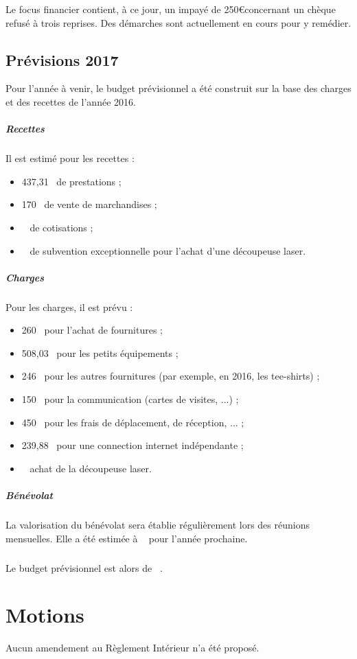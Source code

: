 \documentclass[11pt]{article}
\begin{document}
Le focus financier contient, à ce jour, un impayé de 250\euro concernant un chèque refusé
à trois reprises. Des démarches sont actuellement en cours pour y remédier.

\subsection{Prévisions 2017}

Pour l'année à venir, le budget prévisionnel a été construit sur la base des charges
et des recettes de l'année 2016.

\subparagraph{Recettes}
Il est estimé pour les recettes :
\begin{itemize}
 \item 437,31~\officialeuro{} de prestations ;
 \item 170~\officialeuro{} de vente de marchandises ;
 \item {}~\officialeuro{} de cotisations ;
 \item {}~\officialeuro{} de subvention exceptionnelle pour l'achat d'une découpeuse laser.
\end{itemize}

\subparagraph{Charges}
Pour les charges, il est prévu :
\begin{itemize}
 \item 260~\officialeuro{} pour l'achat de fournitures ;
 \item 508,03~\officialeuro{} pour les petits équipements ;
 \item 246~\officialeuro{} pour les autres fournitures (par exemple, en 2016, les tee-shirts) ;
 \item 150~\officialeuro{} pour la communication (cartes de visites, ...) ;
 \item 450~\officialeuro{} pour les frais de déplacement, de réception, ... ;
 \item 239,88~\officialeuro{} pour une connection internet indépendante ;
 \item {}~\officialeuro{} achat de la découpeuse laser.
\end{itemize}

\subparagraph{Bénévolat}La valorisation du bénévolat sera établie régulièrement lors des réunions mensuelles.
Elle a été estimée à ~\officialeuro{} pour l'année prochaine.

\subparagraph{}Le budget prévisionnel est alors de ~\officialeuro{}.

\section{Motions}
Aucun amendement au Règlement Intérieur n'a été proposé.
\end{document}

